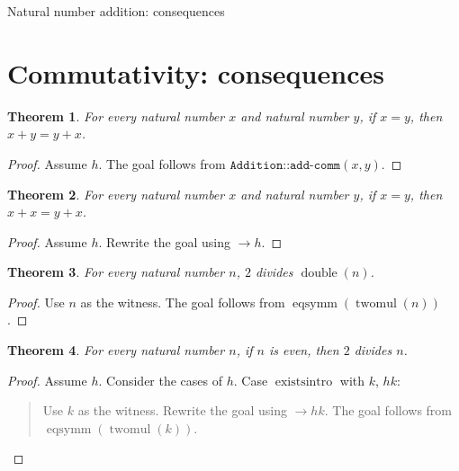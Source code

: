 \documentclass[11pt]{article}
\newtheorem{theorem}{Theorem}[section]
\theoremstyle{definition}
\begin{document}
\begin{center}
{\LARGE Natural number addition: consequences}
\end{center}
\section{Commutativity: consequences}
\label{ll:main:consequences}
\begin{theorem}
\label{ll:main:comm-under-hypothesis}
For every natural number \(x\) and natural number \(y\), if \(x = y\), then \(x + y = y + x\).
\end{theorem}
\begin{proof}
Assume \(h\).
The goal follows from \(\texttt{Addition::add-comm}(x, y)\).
\end{proof}
\begin{theorem}
\label{ll:main:comm-rewrite}
For every natural number \(x\) and natural number \(y\), if \(x = y\), then \(x + x = y + x\).
\end{theorem}
\begin{proof}
Assume \(h\).
Rewrite the goal using \(\rightarrow h\).
\end{proof}
\begin{theorem}
\label{ll:main:double-divides}
For every natural number \(n\), \(2\) divides \(\operatorname{double}(n)\).
\end{theorem}
\begin{proof}
Use \(n\) as the witness.
The goal follows from \(\operatorname{eqsymm}(\operatorname{twomul}(n))\).
\end{proof}
\begin{theorem}
\label{ll:main:even-divides}
For every natural number \(n\), if \(n\) is even, then \(2\) divides \(n\).
\end{theorem}
\begin{proof}
Assume \(h\).
Consider the cases of \(h\).
Case \(\operatorname{existsintro}\) with \(k\), \(hk\):
\begin{quote}
Use \(k\) as the witness.
Rewrite the goal using \(\rightarrow hk\).
The goal follows from \(\operatorname{eqsymm}(\operatorname{twomul}(k))\).
\end{quote}
\end{proof}
\end{document}
